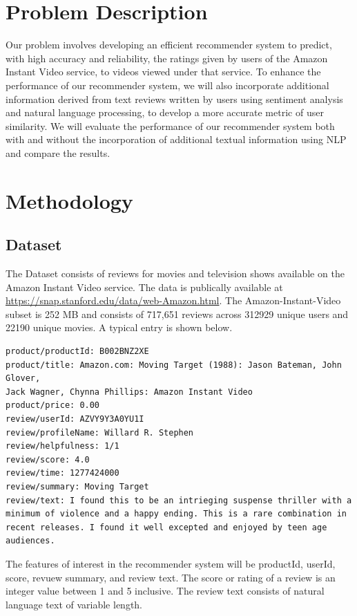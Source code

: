 \documentclass{article} %
\begin{document}
\section{Problem Description}
Our problem involves developing an efficient recommender system to predict, with high accuracy and reliability, the ratings given by users of the Amazon Instant Video service, to videos viewed under that service. To enhance the performance of our recommender system, we will also incorporate additional information derived from text reviews written by users using sentiment analysis and natural language processing, to develop a more accurate metric of user similarity. We will evaluate the performance of our recommender system both with and without the incorporation of additional textual information using NLP and compare the results.

\section{Methodology}
\subsection{Dataset}
The Dataset consists of reviews for movies and television shows available on the Amazon Instant Video service. The data is publically available at \url{https://snap.stanford.edu/data/web-Amazon.html}. The Amazon-Instant-Video subset is 252 MB and consists of 717,651 reviews across 312929 unique users and 22190 unique movies. A typical entry is shown below. 

\begin{verbatim}
product/productId: B002BNZ2XE
product/title: Amazon.com: Moving Target (1988): Jason Bateman, John Glover, 
Jack Wagner, Chynna Phillips: Amazon Instant Video
product/price: 0.00
review/userId: AZVY9Y3A0YU1I
review/profileName: Willard R. Stephen
review/helpfulness: 1/1
review/score: 4.0
review/time: 1277424000
review/summary: Moving Target
review/text: I found this to be an intrieging suspense thriller with a 
minimum of violence and a happy ending. This is a rare combination in 
recent releases. I found it well excepted and enjoyed by teen age 
audiences.
\end{verbatim}

The features of interest in the recommender system will be productId, userId, score, revuew summary, and review text.  The score or rating of a review is an integer value between 1 and 5 inclusive. The review text consists of natural language text of variable length.
\end{document}
